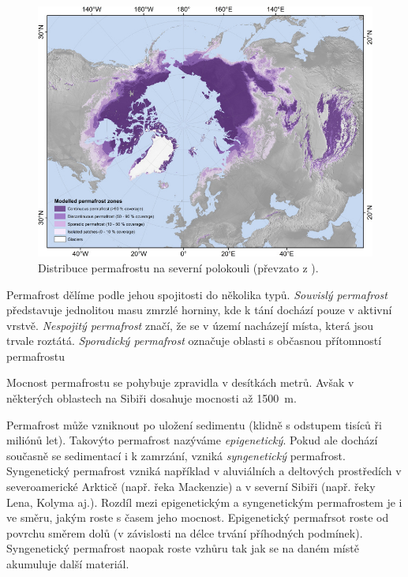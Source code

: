 \begin{figure}[h]
	\centering
	\includegraphics[width=1\linewidth]{obrazky/periglac/permafrost_distr}
	\caption{Distribuce permafrostu na severní polokouli (převzato z \textcite{obuNorthernHemispherePermafrost2019}).}
	\label{fig:permafrostdistr}
\end{figure}

Permafrost dělíme podle jehou spojitosti do několika typů. \emph{Souvislý permafrost} představuje jednolitou masu zmrzlé horniny, kde k tání dochází pouze v aktivní vrstvě. \emph{Nespojitý permafrost} značí, že se v území nacházejí místa, která jsou trvale roztátá. \emph{Sporadický permafrost} označuje oblasti s občasnou přítomností permafrostu 

Mocnost permafrostu se pohybuje zpravidla v desítkách metrů. Avšak v některých oblastech na Sibiři dosahuje mocnosti až \SI{1500}{\metre}. 

Permafrost může vzniknout po uložení sedimentu (klidně s odstupem tisíců ři miliónů let). Takovýto permafrost nazýváme \emph{epigenetický}. Pokud ale dochází současně se sedimentací i k zamrzání, vzniká \emph{syngenetický} permafrost. Syngenetický permafrost vzniká například v aluviálních a deltových prostředích v severoamerické Arkticě (např. řeka Mackenzie) a v severní Sibiři (např. řeky Lena, Kolyma aj.). Rozdíl mezi epigenetickým a syngenetickým permafrostem je i ve směru, jakým roste s časem jeho mocnost. Epigenetický permafrsot roste od povrchu směrem dolů (v závislosti na délce trvání příhodných podmínek). Syngenetický permafrost naopak roste vzhůru tak jak se na daném místě akumuluje další materiál.

